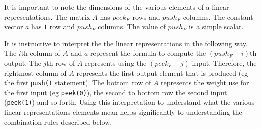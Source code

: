 It is important to note the dimensions of the various elements of a linear representations.
The matrix $A$ has $peek_F$ rows and $push_F$ columns. The constant vector $a$ 
has $1$ row and $push_F$ columns. The value of $push_F$ is a simple scalar.

It is instructive to interpret the the linear representations in the following
way. The $i$th column of $A$ and $a$ represent the formula to compute the 
$(push_F-i)$th output. The $j$th row of $A$ represents using the $(peek_F-j)$ input.
Therefore, the rightmost column of $A$ represents the first output element 
that is produced (eg the first {\tt push()} statement). The bottom row 
of $A$ represents the weight use for the first input 
(eg {\tt peek(0)}), the second to bottom row the second input ({\tt peek(1)}) and so forth.
Using this interpretation to understand what the various linear representations elements mean 
helps significantly to understanding the combination rules described below.




